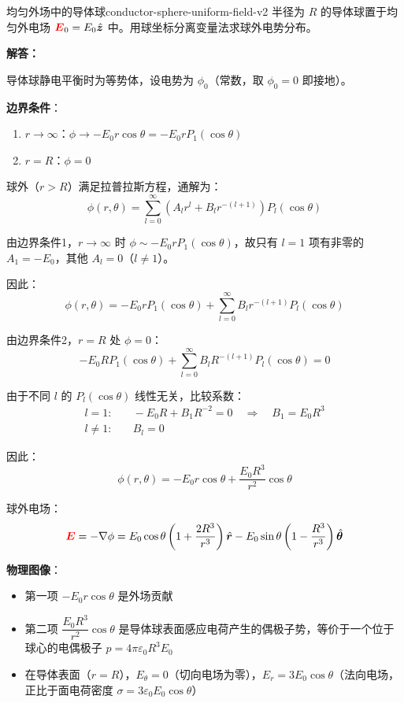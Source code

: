 \documentclass[11pt,a4paper,openany,oneside]{book}
\newcommand{\vecE}{\textcolor{red}{\vect{E}}}
\newcommand{\eps}{\varepsilon}
\newcommand{\vect}[1]{\bm{#1}}
\newcommand{\unitvec}[1]{\hat{\vect{#1}}}
\newcommand{\grad}{\nabla}
\newcommand{\difficulty}[1]{\marginnote{\textcolor{red}{\textbf{[#1]}}}}
\begin{document}
\begin{example}{均匀外场中的导体球}{conductor-sphere-uniform-field-v2}
\difficulty{提高}
半径为 $R$ 的导体球置于均匀外电场 $\vecE_0 = E_0\unitvec{z}$ 中。用球坐标分离变量法求球外电势分布。

\tcblower
\textbf{解答：}

导体球静电平衡时为等势体，设电势为 $\phi_0$（常数，取 $\phi_0 = 0$ 即接地）。

\textbf{边界条件}：
\begin{enumerate}
\item $r \to \infty$：$\phi \to -E_0 r\cos\theta = -E_0 r P_1(\cos\theta)$
\item $r = R$：$\phi = 0$
\end{enumerate}

球外（$r > R$）满足拉普拉斯方程，通解为：
\[
\phi(r,\theta) = \sum_{l=0}^{\infty}\left(A_l r^l + B_l r^{-(l+1)}\right)P_l(\cos\theta)
\]

由边界条件1，$r \to \infty$ 时 $\phi \sim -E_0 r P_1(\cos\theta)$，故只有 $l=1$ 项有非零的 $A_1 = -E_0$，其他 $A_l = 0$（$l \neq 1$）。

因此：
\[
\phi(r,\theta) = -E_0 r P_1(\cos\theta) + \sum_{l=0}^{\infty} B_l r^{-(l+1)}P_l(\cos\theta)
\]

由边界条件2，$r = R$ 处 $\phi = 0$：
\[
-E_0 R P_1(\cos\theta) + \sum_{l=0}^{\infty} B_l R^{-(l+1)}P_l(\cos\theta) = 0
\]

由于不同 $l$ 的 $P_l(\cos\theta)$ 线性无关，比较系数：
\begin{align*}
l=1: &\quad -E_0 R + B_1 R^{-2} = 0 \quad\Rightarrow\quad B_1 = E_0 R^3 \\
l \neq 1: &\quad B_l = 0
\end{align*}

因此：
\[
\phi(r,\theta) = -E_0 r\cos\theta + \frac{E_0 R^3}{r^2}\cos\theta
\]

球外电场：
\[
\vecE = -\grad\phi = E_0\cos\theta\left(1+\frac{2R^3}{r^3}\right)\unitvec{r}
- E_0\sin\theta\left(1-\frac{R^3}{r^3}\right)\unitvec{\theta}
\]

\textbf{物理图像}：
\begin{itemize}
\item 第一项 $-E_0 r\cos\theta$ 是外场贡献
\item 第二项 $\dfrac{E_0 R^3}{r^2}\cos\theta$ 是导体球表面感应电荷产生的偶极子势，等价于一个位于球心的电偶极子 $p = 4\pi\eps_0 R^3 E_0$
\item 在导体表面（$r = R$），$E_\theta = 0$（切向电场为零），$E_r = 3E_0\cos\theta$（法向电场，正比于面电荷密度 $\sigma = 3\eps_0 E_0\cos\theta$）
\end{itemize}
\end{example}
\end{document}
